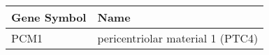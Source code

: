 \begin{tabular}{ll}
\toprule
Gene Symbol &                              Name \\
\midrule
       PCM1 & pericentriolar material 1  (PTC4) \\
\bottomrule
\end{tabular}
